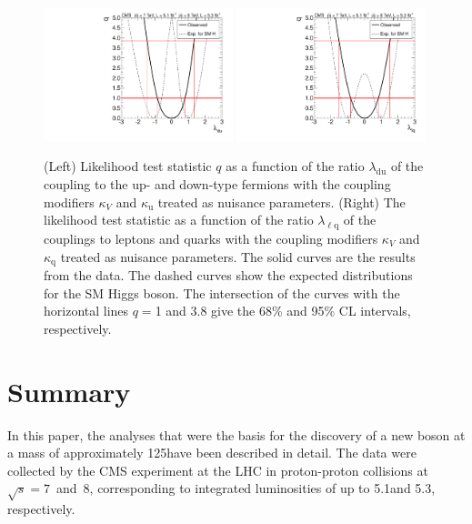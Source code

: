 \documentclass[12pt,twoside,a4paper,cmspaper,final,collab]{cms-tdr}
\begin{document}
\begin{figure}[bhtp]
\centering
\includegraphics[width=0.49\textwidth]{figures/comb/sqr_ldu_scan_1d_all} \hfill
\includegraphics[width=0.49\textwidth]{figures/comb/sqr_llq_scan_1d_all}
\caption{
(Left)  Likelihood test statistic $q$ as a function of
the ratio $\lambda_{\mathrm{du}}$ of the coupling to the up- and down-type fermions
with the coupling modifiers $\kappa_V$ and $\kappa_{\mathrm{u}}$
treated as nuisance parameters.
(Right) The likelihood test statistic as a function of
the ratio $\lambda_{\ell \mathrm{q}}$ of the couplings to leptons and quarks
with the coupling modifiers $\kappa_V$ and $\kappa_{\mathrm{q}}$
treated as nuisance parameters. The solid curves are the results from the
data. The dashed curves show the expected distributions for the SM Higgs boson. The intersection
of the curves with the horizontal lines $q=$1 and 3.8 give the 68\% and 95\% CL intervals, respectively.
}
\label{fig:fit_ldu_llq_scan}
\end{figure}








\section{Summary}\label{sec:Conclusion}

In this paper, the analyses that were the basis for the discovery of a new
boson at a mass of approximately 125\GeV have been described in detail.
The data were collected by the CMS experiment
at the LHC in proton-proton collisions at $\sqrt{s}=7$~and~8\TeV, corresponding
to integrated luminosities of up to 5.1\fbinv and 5.3\fbinv, respectively.
\end{document}
